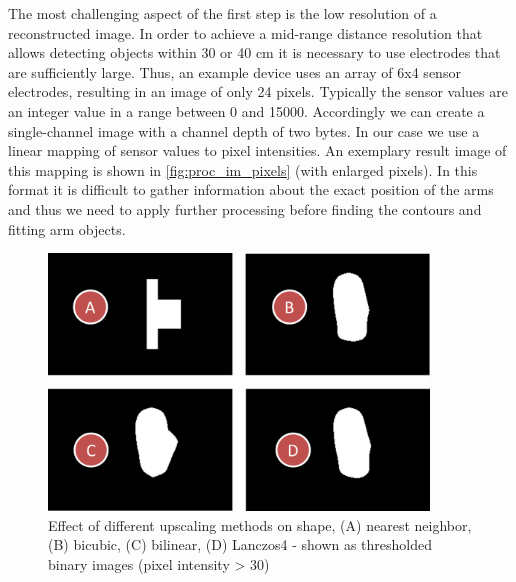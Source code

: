 The most challenging aspect of the first step is the low resolution of a reconstructed image. In order to achieve a mid-range distance resolution that allows detecting objects within 30 or 40 cm it is necessary to use electrodes that are sufficiently large. Thus, an example device uses an array of 6x4 sensor electrodes, resulting in an image of only 24 pixels. Typically the sensor values are an integer value in a range between 0 and 15000. Accordingly we can create a single-channel image with a channel depth of two bytes. In our case we use a linear mapping of sensor values to pixel intensities. An exemplary result image of this mapping is shown in \ref{fig:proc_im_pixels} (with enlarged pixels). In this format it is difficult to gather information about the exact position of the arms and thus we need to apply further processing before finding the contours and fitting arm objects.
\begin{figure}[h]
\centering
\includegraphics[width=0.9\textwidth]{images/proc_im_interpol}
\caption{Effect of different upscaling methods on shape, (A) nearest neighbor, (B) bicubic, (C) bilinear, (D) Lanczos4 - shown as thresholded binary images (pixel intensity > 30)}
\label{fig:proc_im_interpol}
\end{figure}

